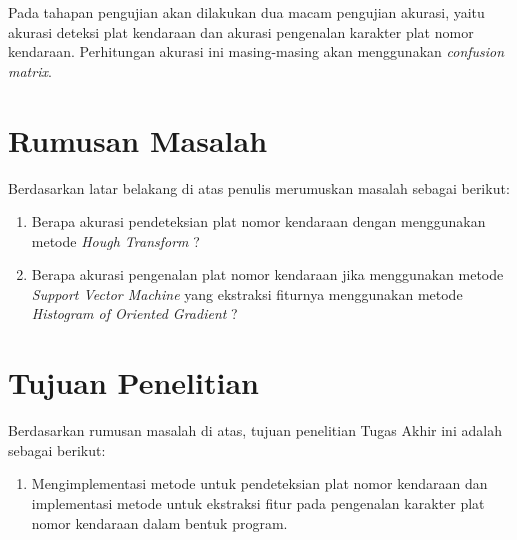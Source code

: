 \noindent Pada tahapan pengujian akan dilakukan dua macam pengujian akurasi, yaitu akurasi deteksi plat kendaraan dan akurasi pengenalan karakter plat nomor kendaraan. Perhitungan akurasi ini masing-masing akan menggunakan \textit{confusion matrix}.\\

\section{Rumusan Masalah}
\noindent Berdasarkan latar belakang di atas penulis merumuskan masalah sebagai berikut:
\begin{enumerate}[nolistsep,leftmargin=0.5cm]
\item Berapa akurasi pendeteksian plat nomor kendaraan dengan menggunakan metode \textit{Hough Transform} ?
\item Berapa akurasi pengenalan plat nomor kendaraan jika menggunakan metode \textit{Support Vector Machine} yang ekstraksi fiturnya menggunakan metode \textit{Histogram of Oriented Gradient} ? \\
\end{enumerate}

\section{Tujuan Penelitian}
\noindent Berdasarkan rumusan masalah di atas, tujuan penelitian Tugas Akhir ini adalah sebagai berikut:
\begin{enumerate}[nolistsep,leftmargin=0.5cm]
\item Mengimplementasi metode untuk pendeteksian plat nomor kendaraan dan implementasi metode untuk ekstraksi fitur pada pengenalan karakter plat nomor kendaraan dalam bentuk program.\\
\end{enumerate}


